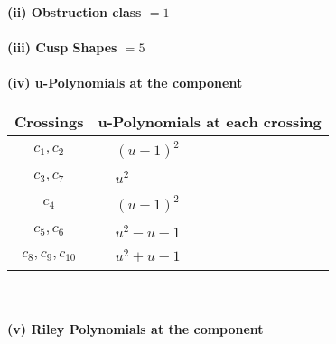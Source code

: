 \documentclass[1p]{elsarticle_modified}
\theoremstyle{definition}
\begin{document}
\flushleft \textbf{(ii) Obstruction class $= 1$}\\~\\
\flushleft \textbf{(iii) Cusp Shapes $= 5$}\\~\\
\newpage\renewcommand{\arraystretch}{1}
\flushleft \textbf{(iv) u-Polynomials at the component}\newline \\
\begin{tabular}{m{50pt}|m{274pt}}
Crossings & \hspace{64pt}u-Polynomials at each crossing \\
\hline $$\begin{aligned}c_{1},c_{2}\end{aligned}$$&$\begin{aligned}
&(u-1)^2
\end{aligned}$\\
\hline $$\begin{aligned}c_{3},c_{7}\end{aligned}$$&$\begin{aligned}
&u^2
\end{aligned}$\\
\hline $$\begin{aligned}c_{4}\end{aligned}$$&$\begin{aligned}
&(u+1)^2
\end{aligned}$\\
\hline $$\begin{aligned}c_{5},c_{6}\end{aligned}$$&$\begin{aligned}
&u^2- u-1
\end{aligned}$\\
\hline $$\begin{aligned}c_{8},c_{9},c_{10}\end{aligned}$$&$\begin{aligned}
&u^2+u-1
\end{aligned}$\\
\hline
\end{tabular}\\~\\
\newpage\renewcommand{\arraystretch}{1}
\flushleft \textbf{(v) Riley Polynomials at the component}\newline \\
\end{document}
